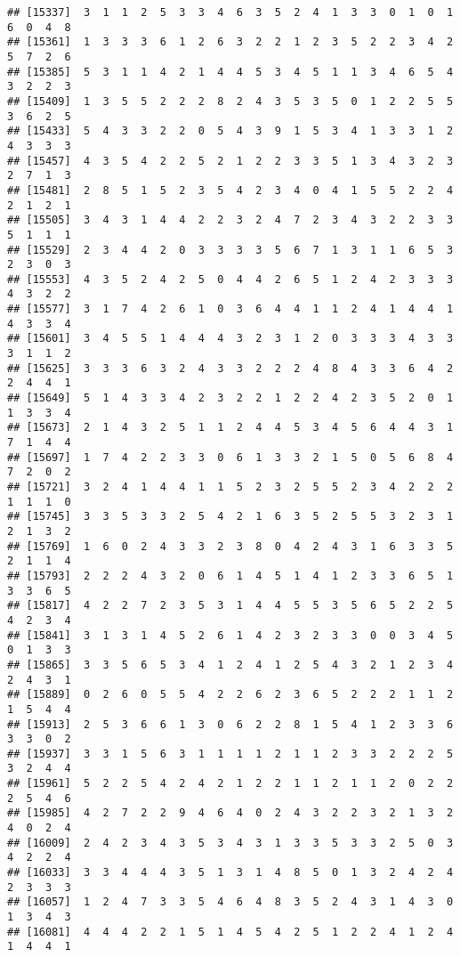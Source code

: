 \documentclass[
]{article}
\begin{document}
\begin{verbatim}
## [15337]  3  1  1  2  5  3  3  4  6  3  5  2  4  1  3  3  0  1  0  1  6  0  4  8
## [15361]  1  3  3  3  6  1  2  6  3  2  2  1  2  3  5  2  2  3  4  2  5  7  2  6
## [15385]  5  3  1  1  4  2  1  4  4  5  3  4  5  1  1  3  4  6  5  4  3  2  2  3
## [15409]  1  3  5  5  2  2  2  8  2  4  3  5  3  5  0  1  2  2  5  5  3  6  2  5
## [15433]  5  4  3  3  2  2  0  5  4  3  9  1  5  3  4  1  3  3  1  2  4  3  3  3
## [15457]  4  3  5  4  2  2  5  2  1  2  2  3  3  5  1  3  4  3  2  3  2  7  1  3
## [15481]  2  8  5  1  5  2  3  5  4  2  3  4  0  4  1  5  5  2  2  4  2  1  2  1
## [15505]  3  4  3  1  4  4  2  2  3  2  4  7  2  3  4  3  2  2  3  3  5  1  1  1
## [15529]  2  3  4  4  2  0  3  3  3  3  5  6  7  1  3  1  1  6  5  3  2  3  0  3
## [15553]  4  3  5  2  4  2  5  0  4  4  2  6  5  1  2  4  2  3  3  3  4  3  2  2
## [15577]  3  1  7  4  2  6  1  0  3  6  4  4  1  1  2  4  1  4  4  1  4  3  3  4
## [15601]  3  4  5  5  1  4  4  4  3  2  3  1  2  0  3  3  3  4  3  3  3  1  1  2
## [15625]  3  3  3  6  3  2  4  3  3  2  2  2  4  8  4  3  3  6  4  2  2  4  4  1
## [15649]  5  1  4  3  3  4  2  3  2  2  1  2  2  4  2  3  5  2  0  1  1  3  3  4
## [15673]  2  1  4  3  2  5  1  1  2  4  4  5  3  4  5  6  4  4  3  1  7  1  4  4
## [15697]  1  7  4  2  2  3  3  0  6  1  3  3  2  1  5  0  5  6  8  4  7  2  0  2
## [15721]  3  2  4  1  4  4  1  1  5  2  3  2  5  5  2  3  4  2  2  2  1  1  1  0
## [15745]  3  3  5  3  3  2  5  4  2  1  6  3  5  2  5  5  3  2  3  1  2  1  3  2
## [15769]  1  6  0  2  4  3  3  2  3  8  0  4  2  4  3  1  6  3  3  5  2  1  1  4
## [15793]  2  2  2  4  3  2  0  6  1  4  5  1  4  1  2  3  3  6  5  1  3  3  6  5
## [15817]  4  2  2  7  2  3  5  3  1  4  4  5  5  3  5  6  5  2  2  5  4  2  3  4
## [15841]  3  1  3  1  4  5  2  6  1  4  2  3  2  3  3  0  0  3  4  5  0  1  3  3
## [15865]  3  3  5  6  5  3  4  1  2  4  1  2  5  4  3  2  1  2  3  4  2  4  3  1
## [15889]  0  2  6  0  5  5  4  2  2  6  2  3  6  5  2  2  2  1  1  2  1  5  4  4
## [15913]  2  5  3  6  6  1  3  0  6  2  2  8  1  5  4  1  2  3  3  6  3  3  0  2
## [15937]  3  3  1  5  6  3  1  1  1  1  2  1  1  2  3  3  2  2  2  5  3  2  4  4
## [15961]  5  2  2  5  4  2  4  2  1  2  2  1  1  2  1  1  2  0  2  2  2  5  4  6
## [15985]  4  2  7  2  2  9  4  6  4  0  2  4  3  2  2  3  2  1  3  2  4  0  2  4
## [16009]  2  4  2  3  4  3  5  3  4  3  1  3  3  5  3  3  2  5  0  3  4  2  2  4
## [16033]  3  3  4  4  4  3  5  1  3  1  4  8  5  0  1  3  2  4  2  4  2  3  3  3
## [16057]  1  2  4  7  3  3  5  4  6  4  8  3  5  2  4  3  1  4  3  0  1  3  4  3
## [16081]  4  4  4  2  2  1  5  1  4  5  4  2  5  1  2  2  4  1  2  4  1  4  4  1

\end{verbatim}
\end{document}
